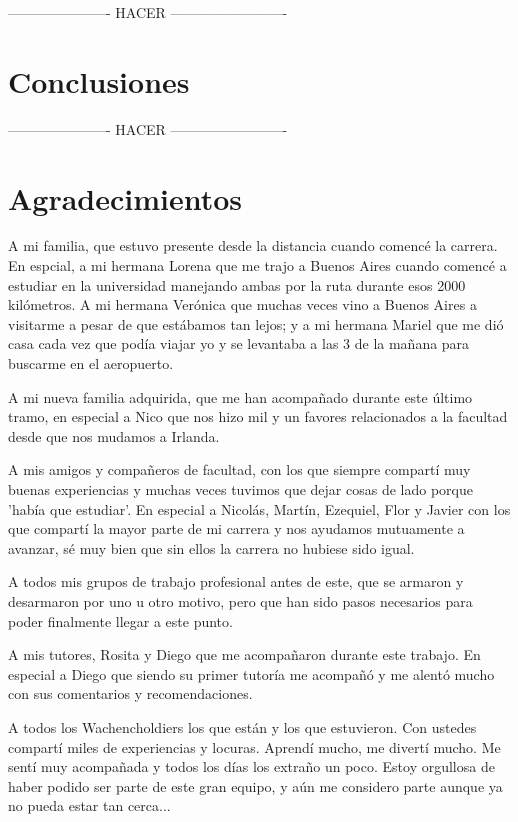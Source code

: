 \documentclass[a4paper]{article}
\begin{document}
---------------------- HACER -------------------------

\newpage
\section{Conclusiones}

---------------------- HACER -------------------------

\newpage
\section{Agradecimientos}

A mi familia, que estuvo presente desde la distancia cuando comencé la carrera. En espcial, a mi hermana Lorena que me trajo a Buenos Aires cuando comencé a estudiar en la universidad manejando ambas por la ruta durante esos 2000 kilómetros. A mi hermana Verónica que muchas veces vino a Buenos Aires a visitarme a pesar de que estábamos tan lejos; y a mi hermana Mariel que me dió casa cada vez que podía viajar yo y se levantaba a las 3 de la mañana para buscarme en el aeropuerto.

A mi nueva familia adquirida, que me han acompañado durante este último tramo, en especial a Nico que nos hizo mil y un favores relacionados a la facultad desde que nos mudamos a Irlanda.

A mis amigos y compañeros de facultad, con los que siempre compartí muy buenas experiencias y muchas veces tuvimos que dejar cosas de lado porque 'había que estudiar'. En especial a Nicolás, Martín, Ezequiel, Flor y Javier con los que compartí la mayor parte de mi carrera y nos ayudamos mutuamente a avanzar, sé muy bien que sin ellos la carrera no hubiese sido igual.

A todos mis grupos de trabajo profesional antes de este, que se armaron y desarmaron por uno u otro motivo, pero que han sido pasos necesarios para poder finalmente llegar a este punto.

A mis tutores, Rosita y Diego que me acompañaron durante este trabajo. En especial a Diego que siendo su primer tutoría me acompañó y me alentó mucho con sus comentarios y recomendaciones.

A todos los Wachencholdiers los que están y los que estuvieron. Con ustedes compartí miles de experiencias y locuras. Aprendí mucho, me divertí mucho. Me sentí muy acompañada y todos los días los extraño un poco. Estoy orgullosa de haber podido ser parte de este gran equipo, y aún me considero parte aunque ya no pueda estar tan cerca...
\end{document}
